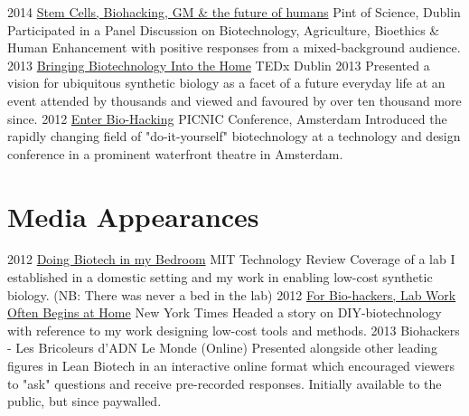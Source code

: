 \documentclass[]{friggeri-cv} %
\begin{document}
\begin{entrylist}
\entry
{2014}
{\href{http://www.pintofscience.ie}{Stem Cells, Biohacking, GM \& the future of humans}}
{Pint of Science, Dublin}
{Participated in a Panel Discussion on Biotechnology, Agriculture, Bioethics \& Human Enhancement
with positive responses from a mixed-background audience. 
}
\entry
{2013}
{\href{https://www.youtube.com/watch?v=g_ZswrLFSdo}{Bringing Biotechnology Into the Home}}
{TEDx Dublin 2013}
{Presented a vision for ubiquitous synthetic biology as a facet of a future everyday life at
an event attended by thousands and viewed and favoured by over ten thousand more since.
}
\entry
{2012}
{\href{http://vimeo.com/51144273}{Enter Bio-Hacking}}
{PICNIC Conference, Amsterdam}
{Introduced the rapidly changing field of "do-it-yourself" biotechnology at a technology
and design conference in a prominent waterfront theatre in Amsterdam.}
\end{entrylist}


\section{Media Appearances}

\begin{entrylist}
\entry
{2012}
{\href{http://www.technologyreview.com/news/426885/doing-biotech-in-my-bedroom/}{Doing Biotech in my Bedroom}}
{MIT Technology Review}
{Coverage of a lab I established in a domestic setting and my work in enabling 
low-cost synthetic biology. (NB: There was never a bed in the lab)
}
\entry
{2012}
{\href{http://www.nytimes.com/2012/01/17/science/for-bio-hackers-lab-work-often-begins-at-home.html?_r=0}{For Bio-hackers, Lab Work Often Begins at Home}}
{New York Times}
{Headed a story on DIY-biotechnology with reference to my work designing low-cost tools and methods.
}
\entry
{2013}
{Biohackers - Les Bricoleurs d'ADN}
{Le Monde (Online)}
{Presented alongside other leading figures in Lean Biotech in an interactive online
format which encouraged viewers to "ask" questions and receive pre-recorded responses.
Initially available to the public, but since paywalled. 
}

\end{entrylist}
\end{document}
